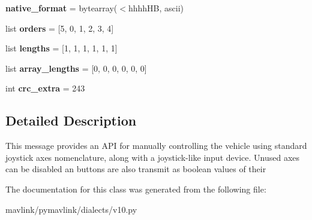 \begin{DoxyCompactItemize}
\mbox{\label{classpymavlink_1_1dialects_1_1v10_1_1MAVLink__manual__control__message_ac4af9149093921d62b69cb028e7e1c2b}} 
{\bfseries native\+\_\+format} = bytearray(\textquotesingle{}$<$hhhh\+HB\textquotesingle{}, \textquotesingle{}ascii\textquotesingle{})
\item 
\mbox{\label{classpymavlink_1_1dialects_1_1v10_1_1MAVLink__manual__control__message_a62c8c1fe462b1a12dd301523fc26b66c}} 
list {\bfseries orders} = \mbox{[}5, 0, 1, 2, 3, 4\mbox{]}
\item 
\mbox{\label{classpymavlink_1_1dialects_1_1v10_1_1MAVLink__manual__control__message_a5ef0b15be2c96c6cb4a590c7346c9204}} 
list {\bfseries lengths} = \mbox{[}1, 1, 1, 1, 1, 1\mbox{]}
\item 
\mbox{\label{classpymavlink_1_1dialects_1_1v10_1_1MAVLink__manual__control__message_af2b4cde6bc7e6997ff98a6f385db521a}} 
list {\bfseries array\+\_\+lengths} = \mbox{[}0, 0, 0, 0, 0, 0\mbox{]}
\item 
\mbox{\label{classpymavlink_1_1dialects_1_1v10_1_1MAVLink__manual__control__message_a89ce66c510af0715805d881f8cb1a932}} 
int {\bfseries crc\+\_\+extra} = 243
\end{DoxyCompactItemize}


\subsection{Detailed Description}
\begin{DoxyVerb}This message provides an API for manually controlling the
vehicle using standard joystick axes nomenclature, along with
a joystick-like input device. Unused axes can be disabled an
buttons are also transmit as boolean values of their
\end{DoxyVerb}
 

The documentation for this class was generated from the following file\+:\begin{DoxyCompactItemize}
\item 
mavlink/pymavlink/dialects/v10.\+py\end{DoxyCompactItemize}
